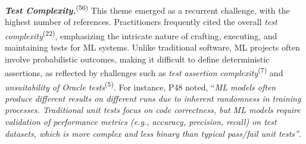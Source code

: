 
\textbf{\textit{Test Complexity.}}\textsuperscript{(56)}
This theme emerged as a recurrent challenge, with the highest number of references. Practitioners frequently cited the overall \textit{test complexity}\textsuperscript{(22)}, emphasizing the intricate nature of crafting, executing, and maintaining tests for ML systems. Unlike traditional software, ML projects often involve probabilistic outcomes, making it difficult to define deterministic assertions, as reflected by challenges such as \textit{test assertion complexity}\textsuperscript{(7)} and \textit{unsuitability of Oracle tests}\textsuperscript{(5)}.
For instance, P48 noted, ``\textit{ML models often produce different results on different runs due to inherent randomness in training processes. Traditional unit tests focus on code correctness, but ML models require validation of performance metrics (e.g., accuracy, precision, recall) on test datasets, which is more complex and less binary than typical pass/fail unit tests''}.

